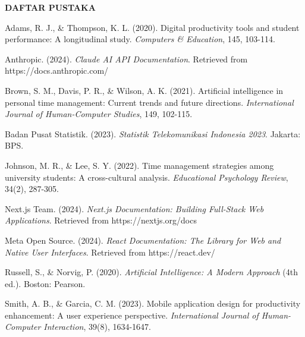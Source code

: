 \documentclass[12pt,a4paper,oneside]{report}
\renewcommand{\headrulewidth}{0pt}
\begin{document}
\pagestyle{fancy}
\fancyhf{}
\fancyhead[R]{\thepage}
\renewcommand{\headrulewidth}{0pt}







\newpage
{}
\begin{center}
{\Large\bfseries DAFTAR PUSTAKA}
\end{center}

\vspace{1cm}

\begin{thebibliography}{99}

Adams, R. J., \& Thompson, K. L. (2020). Digital productivity tools and student performance: A longitudinal study. \textit{Computers \& Education}, 145, 103-114.

Anthropic. (2024). \textit{Claude AI API Documentation}. Retrieved from https://docs.anthropic.com/

Brown, S. M., Davis, P. R., \& Wilson, A. K. (2021). Artificial intelligence in personal time management: Current trends and future directions. \textit{International Journal of Human-Computer Studies}, 149, 102-115.

Badan Pusat Statistik. (2023). \textit{Statistik Telekomunikasi Indonesia 2023}. Jakarta: BPS.

Johnson, M. R., \& Lee, S. Y. (2022). Time management strategies among university students: A cross-cultural analysis. \textit{Educational Psychology Review}, 34(2), 287-305.

Next.js Team. (2024). \textit{Next.js Documentation: Building Full-Stack Web Applications}. Retrieved from https://nextjs.org/docs

Meta Open Source. (2024). \textit{React Documentation: The Library for Web and Native User Interfaces}. Retrieved from https://react.dev/

Russell, S., \& Norvig, P. (2020). \textit{Artificial Intelligence: A Modern Approach} (4th ed.). Boston: Pearson.

Smith, A. B., \& Garcia, C. M. (2023). Mobile application design for productivity enhancement: A user experience perspective. \textit{International Journal of Human-Computer Interaction}, 39(8), 1634-1647.

\end{thebibliography}
\end{document}
